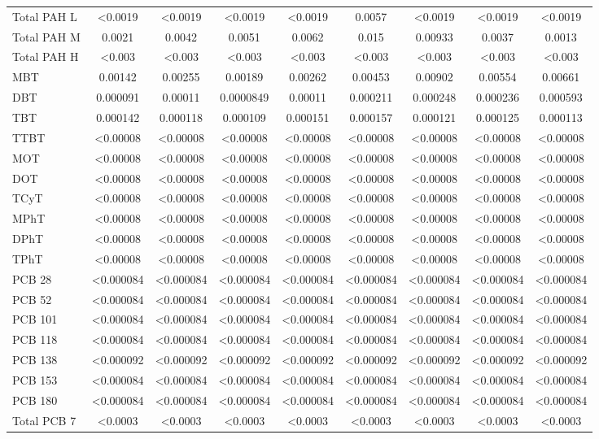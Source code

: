 \documentclass[algorithms,article,submit,pdftex,moreauthors]{Definitions/mdpi}
\begin{document}
\begin{scriptsize}
\begin{center}
\begin{longtable}{@{\extracolsep{\fill}}|p{1.8cm}|cccccccc|@{}}
Total PAH L & <0.0019 & <0.0019 & <0.0019 & <0.0019 & 0.0057 & <0.0019 & <0.0019 & <0.0019 \\
Total PAH M & 0.0021 & 0.0042 & 0.0051 & 0.0062 & 0.015 & 0.00933 & 0.0037 & 0.0013 \\
Total PAH H & <0.003 & <0.003 & <0.003 & <0.003 & <0.003 & <0.003 & <0.003 & <0.003  \\
MBT & 0.00142 & 0.00255 & 0.00189 & 0.00262 & 0.00453 & 0.00902 & 0.00554 & 0.00661 \\
DBT& 0.000091 & 0.00011 & 0.0000849 & 0.00011 & 0.000211 & 0.000248 & 0.000236 & 0.000593 \\
TBT & 0.000142 & 0.000118 & 0.000109 & 0.000151 & 0.000157 & 0.000121 & 0.000125 & 0.000113 \\
TTBT & <0.00008 & <0.00008 & <0.00008 & <0.00008 & <0.00008 & <0.00008 & <0.00008 & <0.00008  \\
MOT & <0.00008 & <0.00008 & <0.00008 & <0.00008 & <0.00008 & <0.00008 & <0.00008 & <0.00008  \\
DOT & <0.00008 & <0.00008 & <0.00008 & <0.00008 & <0.00008 & <0.00008 & <0.00008 & <0.00008  \\
TCyT & <0.00008 & <0.00008 & <0.00008 & <0.00008 & <0.00008 & <0.00008 & <0.00008 & <0.00008  \\
MPhT & <0.00008 & <0.00008 & <0.00008 & <0.00008 & <0.00008 & <0.00008 & <0.00008 & <0.00008  \\
DPhT & <0.00008 & <0.00008 & <0.00008 & <0.00008 & <0.00008 & <0.00008 & <0.00008 & <0.00008  \\
TPhT & <0.00008 & <0.00008 & <0.00008 & <0.00008 & <0.00008 & <0.00008 & <0.00008 & <0.00008  \\
PCB 28 & <0.000084 & <0.000084 & <0.000084 & <0.000084 & <0.000084 & <0.000084 & <0.000084 & <0.000084 \\
PCB 52 & <0.000084 & <0.000084 & <0.000084 & <0.000084 & <0.000084 & <0.000084 & <0.000084 & <0.000084 \\
PCB 101 & <0.000084 & <0.000084 & <0.000084 & <0.000084 & <0.000084 & <0.000084 & <0.000084 & <0.000084 \\
PCB 118 & <0.000084 & <0.000084 & <0.000084 & <0.000084 & <0.000084 & <0.000084 & <0.000084 & <0.000084 \\
PCB 138 & <0.000092 & <0.000092 & <0.000092 & <0.000092 & <0.000092 & <0.000092 & <0.000092 & <0.000092 \\
PCB 153 & <0.000084 & <0.000084 & <0.000084 & <0.000084 & <0.000084 & <0.000084 & <0.000084 & <0.000084 \\
PCB 180 & <0.000084 & <0.000084 & <0.000084 & <0.000084 & <0.000084 & <0.000084 & <0.000084 & <0.000084 \\
Total PCB 7 & <0.0003 & <0.0003 & <0.0003 & <0.0003 & <0.0003 & <0.0003 & <0.0003 & <0.0003 \\
%
\end{longtable}
\end{center}
\end{scriptsize}
\end{document}
